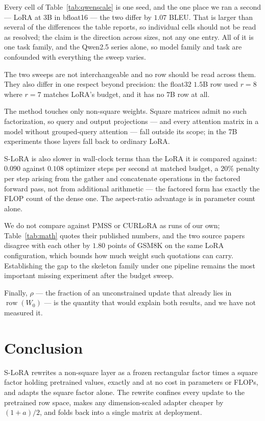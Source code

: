 \documentclass{article}
\theoremstyle{remark}
\begin{document}
Every cell of Table~\ref{tab:qwenscale} is one seed, and the one place we ran a
second --- LoRA at $3$B in bfloat16 --- the two differ by $1.07$ BLEU. That is
larger than several of the differences the table reports, so individual cells
should not be read as resolved; the claim is the direction across sizes, not any
one entry. All of it is one task family, and the Qwen2.5 series alone, so model
family and task are confounded with everything the sweep varies.

The two sweeps are not interchangeable and no row should be read across them.
They also differ in one respect beyond precision: the float32 $1.5$B row used
$r{=}8$ where $r{=}7$ matches LoRA's budget, and it has no $7$B row at all.

The method touches only non-square weights. Square matrices admit no such
factorization, so query and output projections --- and every attention matrix
in a model without grouped-query attention --- fall outside its scope; in the
7B experiments those layers fall back to ordinary LoRA.

S-LoRA is also slower in wall-clock terms than the LoRA it is compared against:
$0.090$ against $0.108$ optimizer steps per second at matched budget, a $20\%$
penalty per step arising from the gather and concatenate operations in the
factored forward pass, not from additional arithmetic --- the factored form has
exactly the FLOP count of the dense one. The aspect-ratio advantage is in
parameter count alone.

We do not compare against PMSS \citep{wang2025pmss} or CURLoRA
\citep{fawi2024curlora} as runs of our own; Table~\ref{tab:math} quotes their
published numbers, and the two source papers disagree with each other by
$1.80$ points of GSM8K on the same LoRA configuration, which bounds how much
weight such quotations can carry. Establishing the gap to the skeleton family
under one pipeline remains the most important missing experiment after the
budget sweep.

Finally, $\rho$ --- the fraction of an unconstrained update that already lies
in $\operatorname{row}(W_0)$ --- is the quantity that would explain both
results, and we have not measured it.

\section{Conclusion}

S-LoRA rewrites a non-square layer as a frozen rectangular factor times a
square factor holding pretrained values, exactly and at no cost in parameters
or FLOPs, and adapts the square factor alone. The rewrite confines every update
to the pretrained row space, makes any dimension-scaled adapter cheaper by
$(1+a)/2$, and folds back into a single matrix at deployment.
\end{document}
